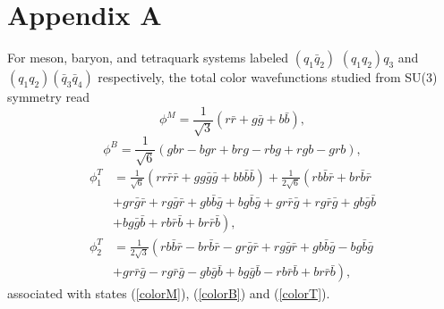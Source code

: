 \documentclass[prt,twocolumn,floatfix,nofootinbib]{revtex4}
\begin{document}
\section*{Appendix A}\label{AppendixA}
\setcounter{equation}{0}
\renewcommand{\theequation}{A\arabic{equation}}
For meson, baryon, and tetraquark systems labeled $(q_{1}\bar{q}_{2})$ $(q_{1}q_{2})q_{3}$ and $(q_{1}q_{2})(\bar{q}_{3}\bar{q}_{4})$ respectively,
the total color wavefunctions studied from SU(3) symmetry read
\begin{equation}\label{pcolorM}
    \phi^{M}=\frac{1}{\sqrt{3}} \left(r\bar{r}+g\bar{g}+b\bar{b} \right),
\end{equation}
\begin{equation}\label{pcolorB}
    \phi^{B}=\frac{1}{\sqrt{6}} \left(gbr-bgr+brg-rbg+rgb-grb \right),
\end{equation}
\begin{equation}\label{pcolorT}
    \begin{aligned}
        \phi_{1}^{T}&=\frac{1}{\sqrt{6}} \left(rr\bar{r}\bar{r}+gg\bar{g}\bar{g}+bb\bar{b}\bar{b} \right)
        +\frac{1}{2\sqrt{6}} \left(rb\bar{b}\bar{r}+br\bar{b}\bar{r} \right.\\
        &\left. +gr\bar{g}\bar{r}+rg\bar{g}\bar{r}+gb\bar{b}\bar{g}+bg\bar{b}\bar{g}+gr\bar{r}\bar{g}+rg\bar{r}\bar{g}+gb\bar{g}\bar{b} \right.\\
        &\left. +bg\bar{g}\bar{b}+rb\bar{r}\bar{b}+br\bar{r}\bar{b} \right), \\
        \phi_{2}^{T}&=\frac{1}{2\sqrt{3}} \left(rb\bar{b}\bar{r}-br\bar{b}\bar{r}-gr\bar{g}\bar{r}+rg\bar{g}\bar{r}+gb\bar{b}\bar{g}-bg\bar{b}\bar{g} \right.\\
        &\left. +gr\bar{r}\bar{g}-rg\bar{r}\bar{g}-gb\bar{g}\bar{b}+bg\bar{g}\bar{b}-rb\bar{r}\bar{b}+br\bar{r}\bar{b}\right),
    \end{aligned}
\end{equation}
associated with states (\ref{colorM}), (\ref{colorB}) and (\ref{colorT}).
\end{document}
